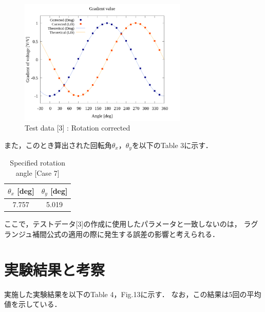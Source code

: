 \documentclass[twocolumn,a4j]{jsarticle}
\begin{document}
\begin{figure}[htbp]
    \begin{center}
        \includegraphics[width=80mm]{../../../02_workspace/result/simulation_tx=10.0_ty=-5.0_dx=5.00_dy=-2.50/plot/21/21-4_summary.png}
        \caption{Test data [3] : Rotation corrected}
    \end{center}
\end{figure}

また，このとき算出された回転角$\theta_x$，$\theta_y$を以下のTable 3に示す．

\begin{table}[htbp]
    \begin{center}
        \caption{Specified rotation angle [Case 7]}
        \begin{tabular}{|p{20mm}|p{20mm}|}
            \hline
            \multicolumn{1}{|c|}{$\theta_x$ [deg]} & \multicolumn{1}{|c|}{$\theta_y$ [deg]} \\ \hline
            \multicolumn{1}{|c|}{7.757}           & \multicolumn{1}{|c|}{5.019}           \\ \hline
        \end{tabular}
    \end{center}
\end{table}

ここで，テストデータ[3]の作成に使用したパラメータと一致しないのは，
ラグランジュ補間公式の適用の際に発生する誤差の影響と考えられる．

\section{実験結果と考察}

実施した実験結果を以下のTable 4，Fig.13に示す．
なお，この結果は5回の平均値を示している．
\end{document}
